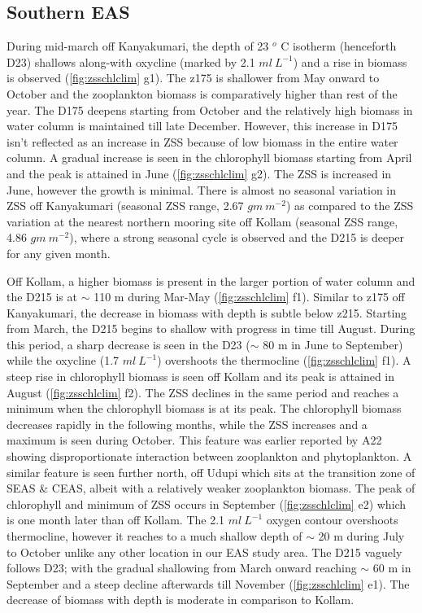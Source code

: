 \documentclass{article}
\begin{document}
	\subsection{Southern EAS}
	During mid-march off Kanyakumari, the depth of 23 $^o$ C isotherm (henceforth D23) shallows along-with oxycline (marked by 2.1 $ml \ L^{-1}$) and a rise in biomass is observed (\cref{fig:zsschlclim} g1). The z175 is shallower from May onward to October and the zooplankton biomass is comparatively higher than rest of the year. The D175 deepens starting from October and the relatively high biomass in water column is maintained till late December. However, this increase in D175 isn't reflected as an increase in ZSS because of low biomass in the entire water column. A gradual increase is seen in the chlorophyll biomass starting from April and the peak is attained in June (\cref{fig:zsschlclim} g2). The ZSS is increased in June, however the growth is minimal. There is almost no seasonal variation in ZSS off Kanyakumari (seasonal ZSS range, 2.67 $gm\ m^{-2}$) as compared to the ZSS variation at the nearest northern mooring site off Kollam (seasonal ZSS range, 4.86 $gm\ m^{-2}$), where a strong seasonal cycle is observed and the D215 is deeper for any given month.
	
	Off Kollam, a higher biomass is present in the larger portion of water column and the D215 is at $\sim$ 110 m during Mar-May (\cref{fig:zsschlclim} f1). Similar to z175 off Kanyakumari, the decrease in biomass with depth is subtle below z215. Starting from March, the D215 begins to shallow with progress in time till August. During this period, a sharp decrease is seen in the D23 ($\sim$ 80 m in June to September) while the oxycline (1.7 $ml \ L^{-1}$) overshoots the thermocline (\cref{fig:zsschlclim} f1). A steep rise in chlorophyll biomass is seen off Kollam and its peak is attained in August (\cref{fig:zsschlclim} f2). The ZSS declines in the same period and reaches a minimum when the chlorophyll biomass is at its peak. The chlorophyll biomass decreases rapidly in the following months, while the ZSS increases and a maximum is seen during October. This feature was earlier reported by A22 showing disproportionate interaction between zooplankton and phytoplankton. A similar feature is seen further north, off Udupi which sits at the transition zone of SEAS \& CEAS, albeit with a relatively weaker zooplankton biomass. The peak of chlorophyll and minimum of ZSS occurs in September (\cref{fig:zsschlclim} e2) which is one month later than off Kollam. The 2.1 $ml \ L^{-1}$  oxygen contour overshoots thermocline, however it reaches to a much shallow depth of $\sim$ 20 m during July to October unlike any other location in our EAS study area. The D215 vaguely follows D23; with the gradual shallowing from March onward reaching $\sim$ 60 m in September and a steep decline afterwards till November (\cref{fig:zsschlclim} e1). The decrease of biomass with depth is moderate in comparison to Kollam.
	
\end{document}

